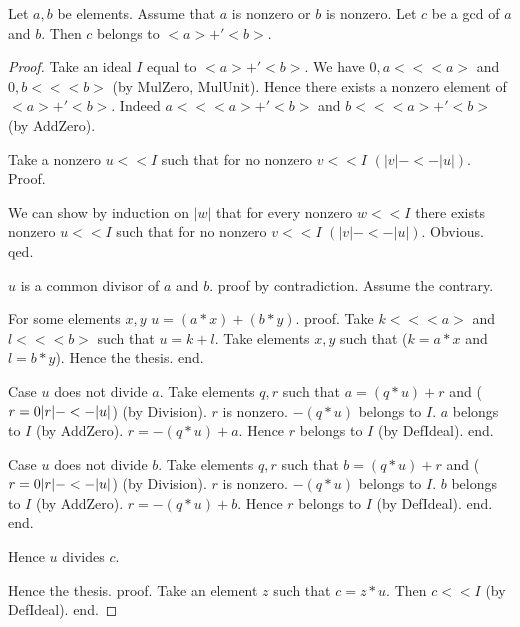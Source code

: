 \documentclass{article}
\begin{document}
\begin{forthel}
  \begin{theorem}[GCDin]
    Let $a,b$ be elements. Assume that $a$ is nonzero or $b$ is nonzero. Let $c$ be a gcd of $a$ and $b$. Then $c$ belongs to $<a> +' <b>$.
  \end{theorem}
  \begin{proof}
    Take an ideal $I$ equal to $<a> +' <b>$. We have $0,a << <a>$ and $0,b << <b>$ (by MulZero, MulUnit). Hence there exists a nonzero element of $<a> +' <b>$. Indeed $a << <a> +' <b>$ and $b << <a> +' <b>$ (by AddZero).

    Take a nonzero $u << I$ such that for no nonzero $v << I$ $(|v| -<- |u|)$.
    Proof.

      We can show by induction on $|w|$ that for every nonzero $w << I$ there
        exists nonzero $u << I$ such that for no nonzero $v << I$ $(|v| -<- |u|)$.
      Obvious.
    qed.

    $u$ is a common divisor of $a$ and $b$.
    proof by contradiction.
      Assume the contrary.

      For some elements $x,y$ $u = (a * x) + (b * y)$.
      proof.
        Take $k << <a>$ and $l << <b>$ such that $u = k + l$. Take elements $x,y$ such that ($k = a * x$ and $l = b * y$). Hence the thesis.
      end.

      Case $u$ does not divide $a$.
        Take elements $q,r$ such that $a = (q * u) + r$ and ($r = 0 \/ |r| -<- |u|$) (by Division). $r$ is nonzero. $- (q * u)$ belongs to $I$. $a$ belongs to $I$ (by AddZero). $r = - (q * u) + a$. Hence $r$ belongs to $I$ (by DefIdeal).
      end.

      Case $u$ does not divide $b$.
        Take elements $q,r$ such that $b = (q * u) + r$ and ($r = 0 \/ |r| -<- |u|$) (by Division). $r$ is nonzero. $- (q * u)$ belongs to $I$. $b$ belongs to $I$ (by AddZero). $r = - (q * u) + b$. Hence $r$ belongs to $I$ (by DefIdeal).
      end.
    end.

    Hence $u$ divides $c$.

    Hence the thesis.
    proof.
      Take an element $z$ such that $c = z * u$. Then $c << I$ (by DefIdeal).
    end.
  \end{proof}
\end{forthel}
\end{document}

